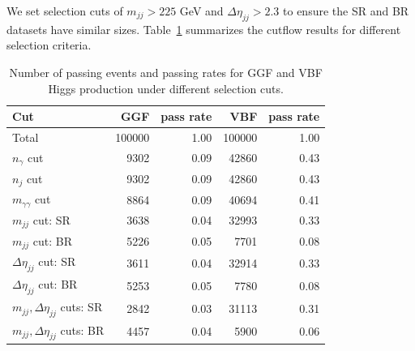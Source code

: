\documentclass[12pt]{article}
\begin{document}
    We set selection cuts of $m_{jj} > 225$ GeV and $\Delta\eta_{jj} > 2.3$ to ensure the SR and BR datasets have similar sizes. Table~\ref{tab:GGF_VBF_Higgs_cutflow_number_mixed_dataset_225_2.3} summarizes the cutflow results for different selection criteria.
    \begin{table}[htpb]
        \centering
        \caption{Number of passing events and passing rates for GGF and VBF Higgs production under different selection cuts.}
        \label{tab:GGF_VBF_Higgs_cutflow_number_mixed_dataset_225_2.3}
        \begin{tabular}{l|rr|rr}
            Cut                                & GGF    & pass rate & VBF    & pass rate \\ \hline
            Total                              & 100000 & 1.00      & 100000 & 1.00      \\
            $n_{\gamma}$ cut                   & 9302   & 0.09      & 42860  & 0.43      \\
            $n_j$ cut                          & 9302   & 0.09      & 42860  & 0.43      \\
            $m_{\gamma\gamma}$ cut             & 8864   & 0.09      & 40694  & 0.41      \\ \hline
            $m_{jj}$ cut: SR                   & 3638   & 0.04      & 32993  & 0.33      \\
            $m_{jj}$ cut: BR                   & 5226   & 0.05      & 7701   & 0.08      \\ \hline
            $\Delta\eta_{jj}$ cut: SR          & 3611   & 0.04      & 32914  & 0.33      \\
            $\Delta\eta_{jj}$ cut: BR          & 5253   & 0.05      & 7780   & 0.08      \\ \hline
            $m_{jj}, \Delta\eta_{jj}$ cuts: SR & 2842   & 0.03      & 31113  & 0.31      \\
            $m_{jj}, \Delta\eta_{jj}$ cuts: BR & 4457   & 0.04      & 5900   & 0.06     
        \end{tabular}
    \end{table}
\end{document}

